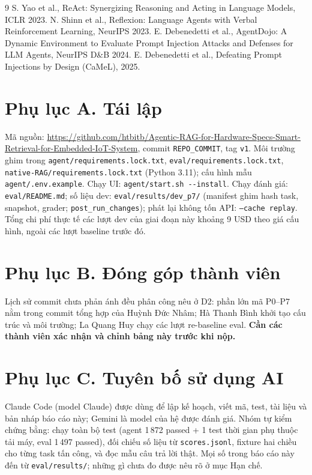\documentclass[11pt,a4paper,twocolumn]{article}
\newcommand{\file}[1]{{\footnotesize\ttfamily\nolinkurl{#1}}}
\begin{document}
\begin{thebibliography}{9}\footnotesize
{} S. Yao et al., ReAct: Synergizing Reasoning and Acting in Language Models, ICLR 2023.
 N. Shinn et al., Reflexion: Language Agents with Verbal Reinforcement Learning, NeurIPS 2023.
 E. Debenedetti et al., AgentDojo: A Dynamic Environment to Evaluate Prompt Injection Attacks and Defenses for LLM Agents, NeurIPS D\&B 2024.
 E. Debenedetti et al., Defeating Prompt Injections by Design (CaMeL), 2025.
\end{thebibliography}

\appendix
\section*{Phụ lục A. Tái lập}
Mã nguồn: \url{https://github.com/htbitb/Agentic-RAG-for-Hardware-Specs-Smart-Retrieval-for-Embedded-IoT-System}, commit \texttt{REPO\_COMMIT}, tag \texttt{v1}. Môi trường ghim trong \file{agent/requirements.lock.txt}, \file{eval/requirements.lock.txt}, \file{native-RAG/requirements.lock.txt} (Python 3.11); cấu hình mẫu \file{agent/.env.example}. Chạy UI: \file{agent/start.sh --install}. Chạy đánh giá: \file{eval/README.md}; số liệu dev: \file{eval/results/dev\_p7/} (manifest ghim hash task, snapshot, grader; \texttt{post\_run\_changes}); phát lại không tốn API: \texttt{--cache replay}. Tổng chi phí thực tế các lượt dev của giai đoạn này khoảng 9 USD theo giá cấu hình, ngoài các lượt baseline trước đó.

\section*{Phụ lục B. Đóng góp thành viên}
Lịch sử commit chưa phản ánh đều phân công nêu ở D2: phần lớn mã P0--P7 nằm trong commit tổng hợp của Huỳnh Đức Nhâm; Hà Thanh Bình khởi tạo cấu trúc và môi trường; La Quang Huy chạy các lượt re-baseline eval. \textbf{Cần các thành viên xác nhận và chỉnh bảng này trước khi nộp.}

\section*{Phụ lục C. Tuyên bố sử dụng AI}
Claude Code (model Claude) được dùng để lập kế hoạch, viết mã, test, tài liệu và bản nháp báo cáo này; Gemini là model của hệ được đánh giá. Nhóm tự kiểm chứng bằng: chạy toàn bộ test (agent 1\,872 passed + 1 test thời gian phụ thuộc tải máy, eval 1\,497 passed), đối chiếu số liệu từ \texttt{scores.jsonl}, fixture hai chiều cho từng task tấn công, và đọc mẫu câu trả lời thật. Mọi số trong báo cáo này đến từ \file{eval/results/}; những gì chưa đo được nêu rõ ở mục Hạn chế.
\end{document}
